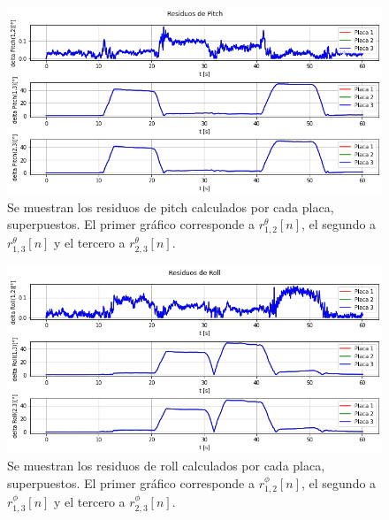 \begin{figure}[H]
    \centering
    \includegraphics[width=\textwidth]{img/resultados_residuos_pitch_enclavado.png}
    \caption{Se muestran los residuos de pitch calculados por cada placa, superpuestos. El primer gráfico corresponde a $r_{1,2}^{\theta}[n]$, el segundo a $r_{1,3}^{\theta}[n]$ y el tercero a $r_{2,3}^{\theta}[n]$.}
    \label{fig:resultados_residuos_pitch_enclavado}
\end{figure}

\begin{figure}
    \centering
    \includegraphics[width=\textwidth]{img/resultados_residuos_roll_enclavado.png}
    \caption{Se muestran los residuos de roll calculados por cada placa, superpuestos. El primer gráfico corresponde a $r_{1,2}^{\phi}[n]$, el segundo a $r_{1,3}^{\phi}[n]$ y el tercero a $r_{2,3}^{\phi}[n]$.}
    \label{fig:resultados_residuos_roll_enclavado}
\end{figure}



